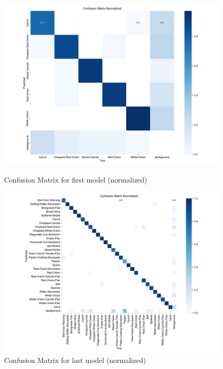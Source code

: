 \documentclass{article}
\begin{document}
\begin{figure}[htbp]
  \begin{minipage}[htbp]{1\linewidth}
    \centering
    \includegraphics[width=\linewidth]{assets/confusion_matrix_normalized-Version-1.png}
    \caption{Confusion Matrix for first model (normalized)}
  \end{minipage}%

  \begin{minipage}[htbp]{1\linewidth}
    \centering
    \includegraphics[width=\linewidth]{assets/confusion_matrix_normalized-Version-6.png}
    \caption{Confusion Matrix for last model (normalized)}
  \end{minipage}
\end{figure}
\end{document}
